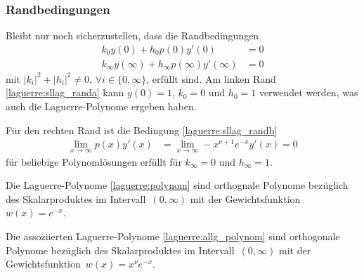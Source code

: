 \subsubsection{Randbedingungen}
Bleibt nur noch sicherzustellen, dass die Randbedingungen
\begin{align}
k_0 y(0) + h_0 p(0)y'(0)
 & =
0
\label{laguerre:sllag_randa}
\\
k_\infty y(\infty) + h_\infty p(\infty) y'(\infty)
 & =
0
\label{laguerre:sllag_randb}
\end{align}
mit $|k_i|^2 + |h_i|^2 \neq 0,\,\forall i \in \{0, \infty\}$, erfüllt sind.
%
Am linken Rand \eqref{laguerre:sllag_randa} kann $y(0) = 1$, $k_0 = 0$ und
$h_0 = 1$ verwendet werden,
was auch die Laguerre-Polynome ergeben haben.

Für den rechten Rand ist die Bedingung \eqref{laguerre:sllag_randb}
\begin{align*}
\lim_{x \rightarrow \infty} p(x) y'(x)
 & =
\lim_{x \rightarrow \infty} -x^{\nu + 1} e^{-x} y'(x)
=
0
\end{align*}
für beliebige Polynomlösungen erfüllt für $k_\infty=0$ und $h_\infty=1$.

\begin{satz}
Die Laguerre-Polynome %
\eqref{laguerre:polynom}
sind orthognale Polynome bezüglich des Skalarproduktes
im Intervall~$(0, \infty)$ mit der Gewichts\-funktion~$w(x)=e^{-x}$.
\end{satz}

\begin{satz}
Die assoziierten Laguerre-Polynome \eqref{laguerre:allg_polynom}
sind orthogonale Polynome bezüglich des Skalarproduktes 
im Intervall~$(0, \infty)$ mit der Gewichts\-funktion~$w(x)=x^\nu e^{-x}$.
\end{satz}
